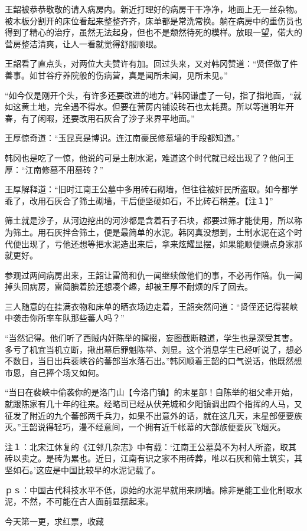 王韶被恭恭敬敬的请入病房内。新近打理好的病房干干净净，地面上无一丝杂物。被木板分割开的床位看起来整整齐齐，床单都是常洗常换。躺在病房中的重伤员也得到了精心的治疗，虽然无法起身，但也不是颓然待死的模样。放眼一望，偌大的营房整洁清爽，让人一看就觉得舒服顺眼。

王韶看了直点头，对两位大夫赞许有加。回过头来，又对韩冈赞道：“贤侄做了件善事。如甘谷疗养院般的伤病营，真是闻所未闻，见所未见。”

“如今仅是刚开个头，有许多还要改进的地方。”韩冈谦虚了一句，指了指地面，“就如这黄土地，完全遇不得水。但要在营房内铺设砖石也太耗费。所以等道明年开春，有了闲暇，还要改用石灰合了沙子来界平地面。”

王厚惊奇道：“玉昆真是博识。连江南豪民修墓墙的手段都知道。”

韩冈也是吃了一惊，他说的可是土制水泥，难道这个时代就已经出现了？他问王厚：“江南修墓不用墓砖？”

王厚解释道：“旧时江南王公墓中多用砖石砌墙，但往往被奸民所盗取。如今都学乖了，改用石灰合了筛土砌墙，干后便坚硬如石，不比砖石稍差。【注１】”

筛土就是沙子，从河边挖出的河沙都是含着石子石块，都要过筛才能使用，所以称为筛土。用石灰拌合筛土，便是最简单的水泥。韩冈真没想到，土制水泥在这个时代便出现了，亏他还想等把水泥造出来后，拿来炫耀显摆，如果能顺便赚点身家那就更好。

参观过两间病房出来，王韶让雷简和仇一闻继续做他们的事，不必再作陪。仇一闻掉头回病房，雷简腆着脸还想凑个趣，却被王厚不耐烦的斥了回去。

三人随意的在挂满衣物和床单的晒衣场边走着，王韶突然问道：“贤侄还记得裴峡中袭击你所率车队那些蕃人吗？”

“当然记得。他们听了西贼内奸陈举的撺掇，妄图截断粮道，学生也是深受其害。多亏了机宜当机立断，揪出幕后罪魁陈举、刘显。这个消息学生已经听说了，想必不数日，当日出兵裴峡谷的蕃部当水落石出。”韩冈顺着王韶的口气说话，他既然想市恩，自己捧个场又如何。

“当日在裴峡中偷袭你的是洛门山【今洛门镇】的末星部！自陈举的祖父辈开始，就跟陈家有几十年的往来。经略司已经从伏羌城和夕阳镇调出四个指挥的人马，又征发了附近的九个蕃部两千兵力，如果不出意外的话，就在这几天，末星部便要族灭。”王韶说得轻巧，漫不经意间，一个拥有近千帐幕的大部族便要灰飞烟灭。

注１：北宋江休复的《江邻几杂志》中有载：‘江南王公墓莫不为村人所盗，取其砖以卖之。是砖为累也。近日，江南有识之家不用砖葬，唯以石灰和筛土筑实，其坚如石。’这应是中国比较早的水泥记载了。

ｐｓ：中国古代科技水平不低，原始的水泥早就用来刷墙。除非是能工业化制取水泥，不然，不可能在古人面前显摆起来。

今天第一更，求红票，收藏

